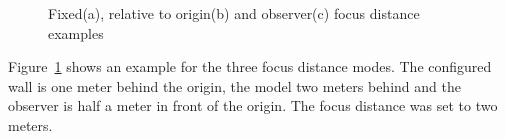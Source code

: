 \documentclass[10pt,a4]{scrartcl}
\newcommand{\fig}[1]{Figure~\ref{#1}}
\begin{document}
\begin{figure}[h!t]\center
  \hfil
  \hfil
            {\caption{\label{fImmersiveEx}Fixed(a), relative to origin(b) and
                observer(c) focus distance examples}}
\end{figure}

\fig{fImmersiveEx} shows an example for the three focus distance modes. The
configured wall is one meter behind the origin, the model two meters behind and
the observer is half a meter in front of the origin. The focus distance was set
to two meters.
\end{document}
